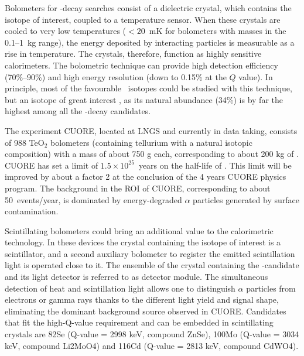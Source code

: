 %
Bolometers for \bbonu-decay searches consist of a dielectric crystal, which contains the isotope of interest, coupled to a temperature sensor. When these crystals are cooled to very low temperatures ($<20$~mK for bolometers with masses in the 0.1--1~kg range), the energy deposited by interacting particles is measurable as a rise in temperature. The crystals, therefore, function as highly sensitive calorimeters. The bolometric technique can provide high detection efficiency (70\%--90\%) and high energy resolution (down to 0.15\% at the $Q$ value). In principle, most of the favourable \bb\ isotopes could be studied with this technique, but an isotope of great interest , as its natural abundance (34\%) is by far the highest among all the \bbonu-decay candidates. 

The experiment CUORE, located at LNGS and currently in data taking, consists of 988 TeO$_2$ bolometers (containing tellurium with a natural isotopic composition) with a mass of about 750 g each, corresponding to about 200 kg of . CUORE has set a limit of $1.5\times10^{25}$~years on the half-life of . This limit will be improved by about a factor 2 at the conclusion of the 4 years CUORE physics program. The background in the ROI of CUORE, corresponding to about 50~events/year, is dominated by energy-degraded $\alpha$ particles generated by surface contamination. 

Scintillating bolometers could bring an additional value to the calorimetric technology. In these devices the crystal containing the isotope of interest is a scintillator, and a second auxiliary bolometer to register the emitted scintillation light is operated close to it. The ensemble of the crystal containing the \bbonu-candidate and its light detector is referred to as detector module. The simultaneous detection of heat and scintillation light allows one to distinguish $\alpha$ particles from electrons or gamma rays thanks to the different light yield and signal shape, eliminating the dominant background source observed in CUORE. 
Candidates that fit the high-Q-value requirement and can be embedded in scintillating crystals are 82Se (Q-value = 2998 keV, compound ZnSe), 100Mo (Q-value = 3034 keV, compound Li2MoO4) and 116Cd (Q-value = 2813 keV, compound CdWO4). 

